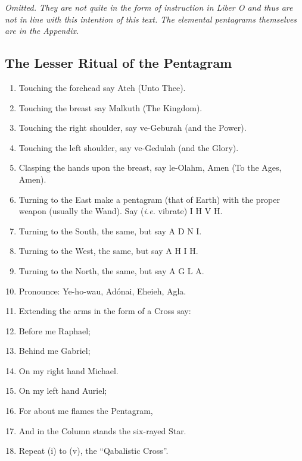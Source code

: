 \textit{Omitted. They are not quite in the form of instruction in Liber O and thus are not in line with this intention of this text. The elemental pentagrams themselves are in the Appendix.}
\clearpage
\begin{Facing}
\subsection*{The Lesser Ritual of the Pentagram}
\begin{enumerate}[label=(\Roman*)]
\item Touching the forehead say Ateh (Unto Thee).
\item Touching the breast say Malkuth (The Kingdom).
\item Touching the right shoulder, say ve-Geburah (and the Power).
\item Touching the left shoulder, say ve-Gedulah (and the Glory).
\item Clasping the hands upon the breast, say le-Olahm, Amen (To the Ages, Amen).
\item Turning to the East make a pentagram (that of Earth) with the proper weapon (usually the Wand). Say (\textit{i.e.} vibrate) \linebreak[2] I H V H.
\item Turning to the South, the same, but say \linebreak[2] A D N I.
\item Turning to the West, the same, but say \linebreak[2] A H I H.
\item Turning to the North, the same, but say \linebreak[2] A G L A.
\item[] Pronounce: Ye-ho-wau, Ad\'{o}nai, Eheieh, Agla.
\item Extending the arms in the form of a Cross say:
\item Before me Raphael;
\item Behind me Gabriel;
\item On my right hand Michael.
\item On my left hand Auriel;
\item For about me flames the Pentagram,
\item And in the Column stands the six-rayed Star.
\item[] Repeat (i) to (v), the \enquote{Qabalistic Cross}.
\end{enumerate}
\end{Facing}

